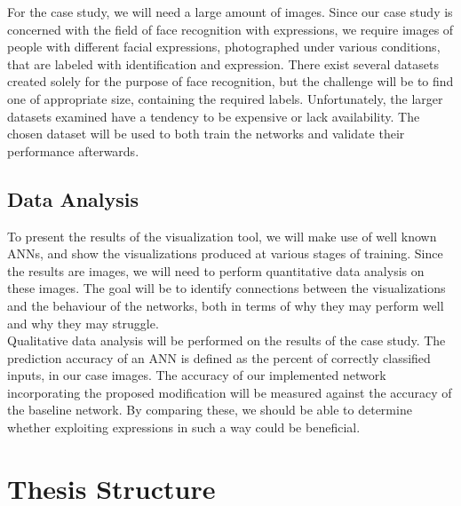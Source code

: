 \noindent For the case study, we will need a large amount of images. Since our case study is concerned with the field of face recognition with expressions, we require images of people with different facial expressions, photographed under various conditions, that are labeled with identification and expression. There exist several datasets created solely for the purpose of face recognition, but the challenge will be to find one of appropriate size, containing the required labels. Unfortunately, the larger datasets examined have a tendency to be expensive or lack availability. The chosen dataset will be used to both train the networks and validate their performance afterwards.

\subsection{Data Analysis}

To present the results of the visualization tool, we will make use of well known ANNs, and show the visualizations produced at various stages of training. Since the results are images, we will need to perform quantitative data analysis on these images. The goal will be to identify connections between the visualizations and the behaviour of the networks, both in terms of why they may perform well and why they may struggle. \\

\noindent Qualitative data analysis will be performed on the results of the case study. The prediction accuracy of an ANN is defined as the percent of correctly classified inputs, in our case images. The accuracy of our implemented network incorporating the proposed modification will be measured against the accuracy of the baseline network. By comparing these, we should be able to determine whether exploiting expressions in such a way could be beneficial.

\section{Thesis Structure}

